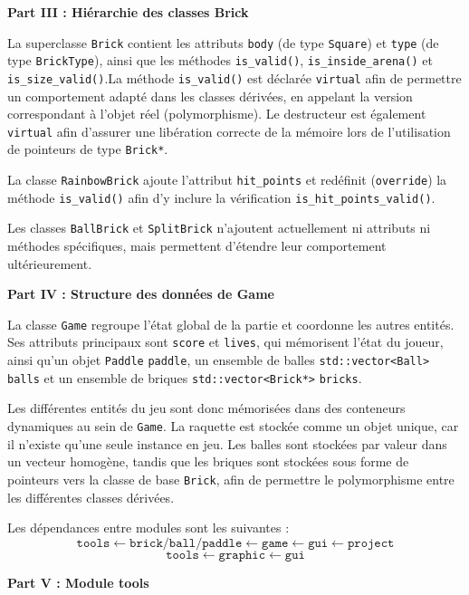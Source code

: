 \documentclass[10pt,a4paper]{article}
\begin{document}
{\large \textbf{Part III : Hiérarchie des classes Brick}}

\begin{list}{}{\leftmargin=0.5cm \rightmargin=0cm}
\item
La superclasse \texttt{Brick} contient les attributs \texttt{body} (de type \texttt{Square}) et \texttt{type} (de type \texttt{BrickType}), ainsi que les méthodes \texttt{is\_valid()}, \texttt{is\_inside\_arena()} et \texttt{is\_size\_valid()}.La méthode \texttt{is\_valid()} est déclarée \texttt{virtual} afin de permettre un comportement adapté dans les classes dérivées, en appelant la version correspondant à l’objet réel (polymorphisme). Le destructeur est également \texttt{virtual} afin d’assurer une libération correcte de la mémoire lors de l’utilisation de pointeurs de type \texttt{Brick*}.

La classe \texttt{RainbowBrick} ajoute l’attribut \texttt{hit\_points} et redéfinit (\texttt{override}) la méthode \texttt{is\_valid()} afin d’y inclure la vérification \texttt{is\_hit\_points\_valid()}.

Les classes \texttt{BallBrick} et \texttt{SplitBrick} n’ajoutent actuellement ni attributs ni méthodes spécifiques, mais permettent d’étendre leur comportement ultérieurement.
\end{list}

{\large \textbf{Part IV : Structure des données de Game}}

\begin{list}{}{\leftmargin=0.5cm \rightmargin=0cm}
\item
La classe \texttt{Game} regroupe l’état global de la partie et coordonne les autres entités. Ses attributs principaux sont \texttt{score} et \texttt{lives}, qui mémorisent l’état du joueur, ainsi qu’un objet \texttt{Paddle} \texttt{paddle}, un ensemble de balles \texttt{std::vector<Ball>} \texttt{balls} et un ensemble de briques \texttt{std::vector<Brick*>} \texttt{bricks}.

Les différentes entités du jeu sont donc mémorisées dans des conteneurs dynamiques au sein de \texttt{Game}. La raquette est stockée comme un objet unique, car il n’existe qu’une seule instance en jeu. Les balles sont stockées par valeur dans un vecteur homogène, tandis que les briques sont stockées sous forme de pointeurs vers la classe de base \texttt{Brick}, afin de permettre le polymorphisme entre les différentes classes dérivées.


Les dépendances entre modules sont les suivantes :
\[
\texttt{tools} \leftarrow \texttt{brick/ball/paddle} \leftarrow \texttt{game} \leftarrow \texttt{gui} \leftarrow \texttt{project}
\]
\[
\texttt{tools} \leftarrow \texttt{graphic} \leftarrow \texttt{gui}
\]
\end{list}
{\large \textbf{Part V : Module tools}}
\end{document}
